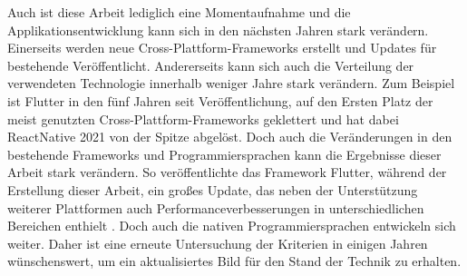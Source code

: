 Auch ist diese Arbeit lediglich eine Momentaufnahme und die Applikationsentwicklung kann sich in den nächsten Jahren stark verändern. Einerseits werden neue Cross-Plattform-Frameworks erstellt und Updates für bestehende Veröffentlicht. Andererseits kann sich auch die Verteilung der verwendeten Technologie innerhalb weniger Jahre stark verändern. Zum Beispiel ist Flutter in den fünf Jahren seit Veröffentlichung, auf den Ersten Platz der meist genutzten Cross-Plattform-Frameworks geklettert und hat dabei ReactNative 2021 von der Spitze abgelöst. Doch auch die Veränderungen in den bestehende Frameworks und Programmiersprachen kann die Ergebnisse dieser Arbeit stark verändern. So veröffentlichte das Framework Flutter, während der Erstellung dieser Arbeit, ein großes Update, das neben der Unterstützung weiterer Plattformen auch Performanceverbesserungen in unterschiedlichen Bereichen enthielt \cite{flutter3}. Doch auch die nativen Programmiersprachen entwickeln sich weiter. Daher ist eine erneute Untersuchung der Kriterien in einigen Jahren wünschenswert, um ein aktualisiertes Bild für den Stand der Technik zu erhalten.
